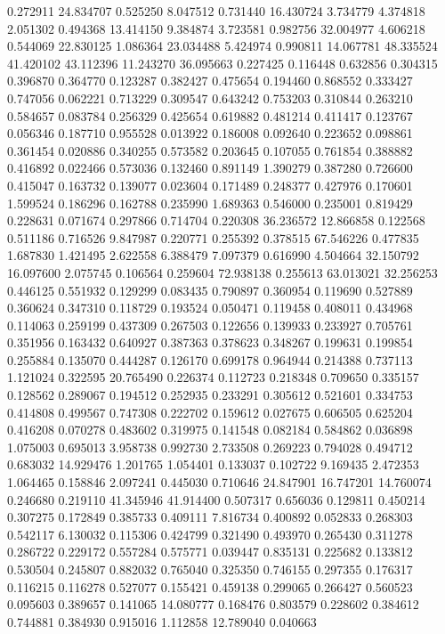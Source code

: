 0.272911
24.834707
0.525250
8.047512
0.731440
16.430724
3.734779
4.374818
2.051302
0.494368
13.414150
9.384874
3.723581
0.982756
32.004977
4.606218
0.544069
22.830125
1.086364
23.034488
5.424974
0.990811
14.067781
48.335524
41.420102
43.112396
11.243270
36.095663
0.227425
0.116448
0.632856
0.304315
0.396870
0.364770
0.123287
0.382427
0.475654
0.194460
0.868552
0.333427
0.747056
0.062221
0.713229
0.309547
0.643242
0.753203
0.310844
0.263210
0.584657
0.083784
0.256329
0.425654
0.619882
0.481214
0.411417
0.123767
0.056346
0.187710
0.955528
0.013922
0.186008
0.092640
0.223652
0.098861
0.361454
0.020886
0.340255
0.573582
0.203645
0.107055
0.761854
0.388882
0.416892
0.022466
0.573036
0.132460
0.891149
1.390279
0.387280
0.726600
0.415047
0.163732
0.139077
0.023604
0.171489
0.248377
0.427976
0.170601
1.599524
0.186296
0.162788
0.235990
1.689363
0.546000
0.235001
0.819429
0.228631
0.071674
0.297866
0.714704
0.220308
36.236572
12.866858
0.122568
0.511186
0.716526
9.847987
0.220771
0.255392
0.378515
67.546226
0.477835
1.687830
1.421495
2.622558
6.388479
7.097379
0.616990
4.504664
32.150792
16.097600
2.075745
0.106564
0.259604
72.938138
0.255613
63.013021
32.256253
0.446125
0.551932
0.129299
0.083435
0.790897
0.360954
0.119690
0.527889
0.360624
0.347310
0.118729
0.193524
0.050471
0.119458
0.408011
0.434968
0.114063
0.259199
0.437309
0.267503
0.122656
0.139933
0.233927
0.705761
0.351956
0.163432
0.640927
0.387363
0.378623
0.348267
0.199631
0.199854
0.255884
0.135070
0.444287
0.126170
0.699178
0.964944
0.214388
0.737113
1.121024
0.322595
20.765490
0.226374
0.112723
0.218348
0.709650
0.335157
0.128562
0.289067
0.194512
0.252935
0.233291
0.305612
0.521601
0.334753
0.414808
0.499567
0.747308
0.222702
0.159612
0.027675
0.606505
0.625204
0.416208
0.070278
0.483602
0.319975
0.141548
0.082184
0.584862
0.036898
1.075003
0.695013
3.958738
0.992730
2.733508
0.269223
0.794028
0.494712
0.683032
14.929476
1.201765
1.054401
0.133037
0.102722
9.169435
2.472353
1.064465
0.158846
2.097241
0.445030
0.710646
24.847901
16.747201
14.760074
0.246680
0.219110
41.345946
41.914400
0.507317
0.656036
0.129811
0.450214
0.307275
0.172849
0.385733
0.409111
7.816734
0.400892
0.052833
0.268303
0.542117
6.130032
0.115306
0.424799
0.321490
0.493970
0.265430
0.311278
0.286722
0.229172
0.557284
0.575771
0.039447
0.835131
0.225682
0.133812
0.530504
0.245807
0.882032
0.765040
0.325350
0.746155
0.297355
0.176317
0.116215
0.116278
0.527077
0.155421
0.459138
0.299065
0.266427
0.560523
0.095603
0.389657
0.141065
14.080777
0.168476
0.803579
0.228602
0.384612
0.744881
0.384930
0.915016
1.112858
12.789040
0.040663
